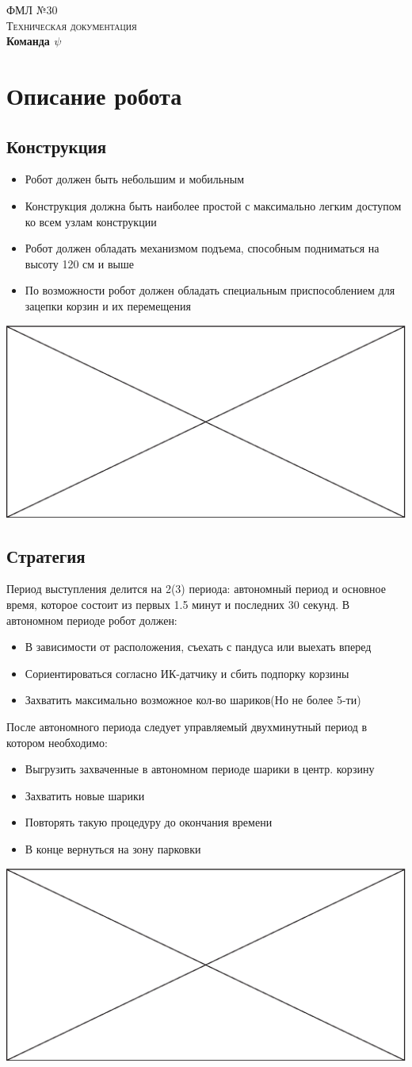 \documentclass[11pt]{article}
\newcommand\measurepage{\dimexpr\pagegoal-\pagetotal-\baselineskip\relax}
\newcommand\fillpage{\includegraphics[width=\textwidth, height=\measurepage]{img/fill_page.eps}}
\begin{document}
   \begin{titlepage}
      \begin{center}
           \textsc{\LARGE{ФМЛ №30}}\\[1.5cm]
	\textsc{\Large Техническая документация}\\[0.5cm]
	{ \huge \bfseries Команда $\psi$ \\[0.4cm] }
	      \end{center}
   \end{titlepage}
	\newpage
	
		

	\section{Описание робота}
		\subsection{Конструкция}
			\begin{itemize}
				\item Робот должен быть небольшим и мобильным
				\item Конструкция должна быть наиболее простой с максимально легким доступом ко всем узлам конструкции
				\item Робот должен обладать механизмом подъема, способным подниматься на высоту 120 см и выше
				\item По возможности робот должен обладать специальным приспособлением для зацепки корзин и их перемещения
			\end{itemize}
			\fillpage
			

	
	
		\subsection{Стратегия}
			Период выступления делится на 2(3) периода: автономный период и основное время, которое состоит из первых 1.5 минут и последних 30 секунд.
			В автономном периоде робот должен:
			\begin{itemize}
				\item В зависимости от расположения, съехать с пандуса или выехать вперед
				\item Сориентироваться согласно ИК-датчику и сбить подпорку корзины
				\item Захватить максимально возможное кол-во шариков(Но не более 5-ти)
			\end{itemize}
			После автономного периода следует управляемый двухминутный период в котором необходимо:
			\begin{itemize}
				\item Выгрузить захваченные в автономном периоде шарики в центр. корзину
				\item Захватить новые шарики 
				\item Повторять такую процедуру до окончания времени
				\item В конце вернуться на зону парковки
			\end{itemize}
			\fillpage
	
\end{document}
